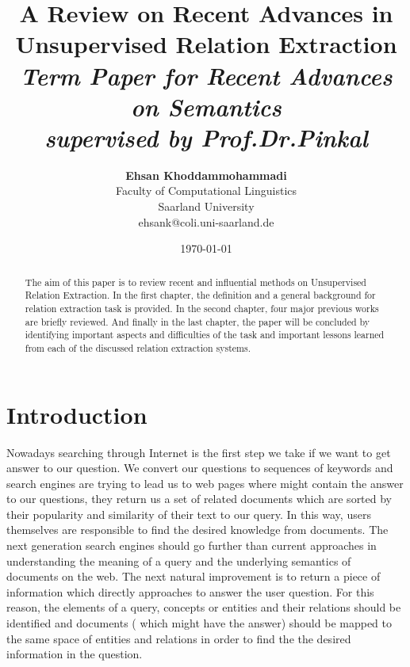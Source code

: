 \documentclass[12pt]{report}
\title{{\bf A Review on Recent Advances in Unsupervised Relation Extraction} \\
\it Term Paper for Recent Advances on Semantics \\ supervised by Prof.Dr.Pinkal}
\author{ {\bf Ehsan Khoddammohammadi}  \\
Faculty of Computational Linguistics \\
Saarland University\\
{\small ehsank@coli.uni-saarland.de}
}
\date{\today}
\begin{document}
\pagestyle{plain}
\maketitle

\pagebreak
\begin{abstract}

The aim of this paper is to review recent and influential methods on
Unsupervised Relation Extraction. In the first chapter, the definition and a general background
for relation extraction task is provided. In the second chapter, four major previous works are
briefly reviewed. And
finally in the last chapter, the paper will be concluded by identifying important aspects and
difficulties of the task and important lessons learned from each of the discussed relation extraction systems.

\end{abstract}

\pagebreak
\tableofcontents
\pagebreak

\cleardoublepage
{}

\chapter{Introduction}
\label{ch:intro}

Nowadays searching through Internet is the first step we take if we want to get answer to our question.
We convert our questions to sequences of keywords and search engines are trying 
to lead us to web pages where might contain the answer to our questions, they return us a set of related
documents which are sorted by their popularity and similarity of their text to our query.
In this way, users themselves are responsible to find the desired knowledge 
from documents. The next generation search engines should go further than current 
approaches in understanding the meaning of a query and the underlying semantics of documents on 
the web. The next natural improvement is to return a piece of information which directly approaches to 
answer the user question. For this reason, the elements of a query, concepts or entities and 
their relations should be identified and documents ( which might have the answer) should be mapped to the 
same space of entities and relations in order to find the the desired information in the question.
\end{document}
